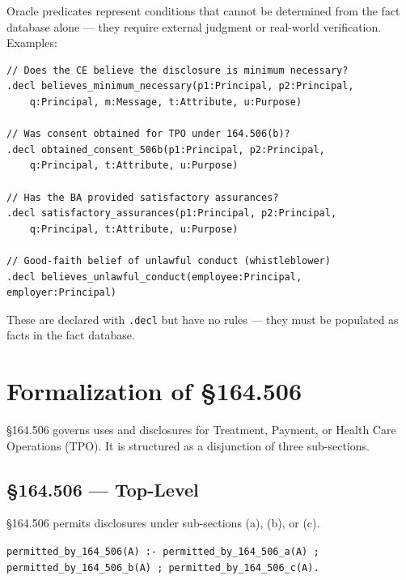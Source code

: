 \documentclass[11pt,letterpaper]{article}
\begin{document}
Oracle predicates represent conditions that cannot be determined from the fact database alone --- they require external judgment or real-world verification. Examples:

\begin{lstlisting}[style=soufflestyle,caption={Oracle predicates from hipaa\_macros.dl}]
// Does the CE believe the disclosure is minimum necessary?
.decl believes_minimum_necessary(p1:Principal, p2:Principal,
    q:Principal, m:Message, t:Attribute, u:Purpose)

// Was consent obtained for TPO under 164.506(b)?
.decl obtained_consent_506b(p1:Principal, p2:Principal,
    q:Principal, t:Attribute, u:Purpose)

// Has the BA provided satisfactory assurances?
.decl satisfactory_assurances(p1:Principal, p2:Principal,
    q:Principal, t:Attribute, u:Purpose)

// Good-faith belief of unlawful conduct (whistleblower)
.decl believes_unlawful_conduct(employee:Principal, employer:Principal)
\end{lstlisting}

These are declared with \texttt{.decl} but have no rules --- they must be populated as facts in the fact database.


\section{Formalization of \S 164.506}
\label{sec:506}

\S 164.506 governs uses and disclosures for Treatment, Payment, or Health Care Operations (TPO). It is structured as a disjunction of three sub-sections.

\subsection{\S 164.506 --- Top-Level}

\begin{hipaabox}
\S 164.506 permits disclosures under sub-sections (a), (b), or (c).
\end{hipaabox}

\begin{pdfbox}
\texttt{permitted\_by\_164\_506(A) :- permitted\_by\_164\_506\_a(A) ;}\\
\texttt{\hspace{2em}permitted\_by\_164\_506\_b(A) ; permitted\_by\_164\_506\_c(A).}
\end{pdfbox}
\end{document}
